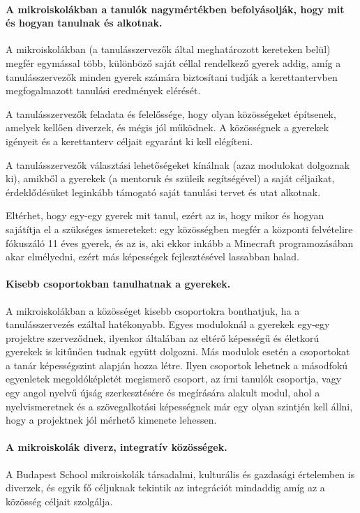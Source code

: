 \paragraph{A mikroiskolákban a tanulók nagymértékben befolyásolják, hogy mit és
      hogyan
      tanulnak és alkotnak.}
A mikroiskolákban (a tanulásszervezők által meghatározott kereteken belül)
megfér egymással több, különböző saját céllal rendelkező gyerek addig, amíg a
tanulásszervezők minden gyerek számára biztosítani tudják a kerettantervben
megfogalmazott tanulási eredmények elérését.

A tanulásszervezők feladata és felelőssége, hogy olyan közösségeket építsenek, amelyek kellően diverzek, és mégis jól
működnek. A közösségnek a gyerekek igényeit és a kerettanterv céljait egyaránt
ki kell elégíteni.

A tanulásszervezők választási lehetőségeket kínálnak (azaz modulokat dolgoznak
ki), amikből a gyerekek (a mentoruk és szüleik segítségével) a saját céljaikat,
érdeklődésüket leginkább támogató saját tanulási tervet és utat alkotnak.

Eltérhet, hogy egy-egy gyerek mit tanul, ezért az is, hogy mikor és hogyan
sajátítja el a szükséges ismereteket: egy közösségben megfér a központi
felvételire fókuszáló 11 éves gyerek, és az is, aki ekkor inkább a Minecraft
programozásában akar elmélyedni, ezért más képességek fejlesztésével lassabban
halad.

\paragraph{Kisebb csoportokban tanulhatnak a gyerekek.}
\label{sec:csoportbontasok}

A mikroiskolákban a közösséget kisebb csoportokra bonthatjuk, ha a
tanulásszervezés ezáltal hatékonyabb. Egyes moduloknál a gyerekek egy-egy
projektre szerveződnek, ilyenkor általában az eltérő képességű és életkorú
gyerekek is kitűnően tudnak együtt dolgozni. Más modulok esetén a csoportokat a
tanár képességszint alapján hozza létre. Ilyen csoportok lehetnek a másodfokú
egyenletek megoldóképletét megismerő csoport, az írni tanulók csoportja, vagy
egy angol nyelvű újság szerkesztésére és megírására alakult modul, ahol a
nyelvismeretnek és a szövegalkotási képességnek már egy olyan szintjén kell
állni, hogy a projektnek jól mérhető kimenete lehessen.

\paragraph{A mikroiskolák diverz, integratív közösségek.}
A Budapest School mikroiskolák társadalmi, kulturális és gazdasági értelemben
is diverzek, és egyik fő céljuknak tekintik az integrációt mindaddig amíg
az a közösség céljait szolgálja.

